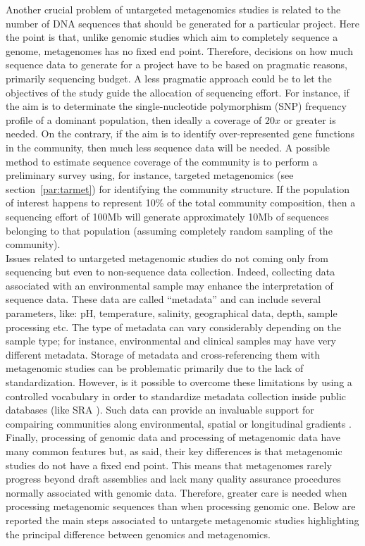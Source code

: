 Another crucial problem of untargeted metagenomics studies is related to the number of DNA sequences that should be generated for a particular project. Here the point is that, unlike genomic studies which aim to completely sequence a genome, metagenomes has no fixed end point. Therefore, decisions on how much sequence data to generate for a project have to be based on pragmatic reasons, primarily sequencing budget. A less pragmatic approach could be to let the objectives of the study guide the allocation of sequencing effort. For instance, if the aim is to determinate the single-nucleotide polymorphism (SNP) frequency profile of a dominant population, then ideally a coverage of $20x$ or greater is needed. On the contrary, if the aim is to identify over-represented gene functions in the community, then much less sequence data will be needed. A possible method to estimate sequence coverage of the community is to perform a preliminary survey using, for instance, targeted metagenomics (see section~\ref{par:tarmet}) for identifying the community structure. If the population of interest happens to represent 10\% of the total community composition, then a sequencing effort of 100Mb will generate approximately 10Mb of sequences belonging to that population (assuming completely random sampling of the community).\\
Issues related to untargeted metagenomic studies do not coming only from sequencing but even to non-sequence data collection. Indeed, collecting data associated with an environmental sample may enhance the interpretation of sequence data. These data are called ``metadata'' and can include several parameters, like: pH, temperature, salinity, geographical data, depth, sample processing etc. The type of metadata can vary considerably depending on the sample type; for instance, environmental and clinical samples may have very different metadata. Storage of metadata and cross-referencing them with metagenomic studies can be problematic primarily due to the lack of standardization. However, is it possible to overcome these limitations by using a controlled vocabulary in order to standardize metadata collection inside public databases (like SRA \cite{kodama2012sequence}). Such data can provide an invaluable support for compairing communities along environmental, spatial or longitudinal gradients \cite{erkel2006genome}.\\
Finally, processing of genomic data and processing of metagenomic data have many common features but, as said, their key differences is that metagenomic studies do not have a fixed end point. This means that metagenomes rarely progress beyond draft assemblies and lack many quality assurance procedures normally associated with genomic data. Therefore, greater care is needed when processing metagenomic sequences than when processing genomic one. Below are reported the main steps associated to untargete metagenomic studies highlighting the principal difference between genomics and metagenomics.\\

